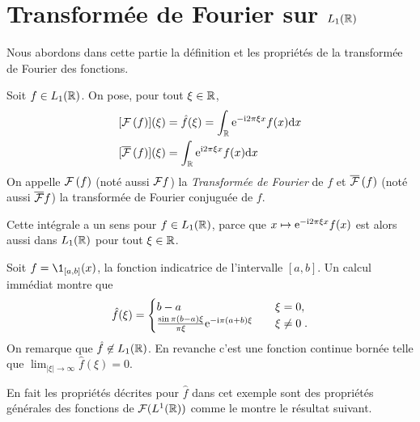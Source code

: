 
\section{Transform{\'e}e de Fourier sur $L_1(\mathbb{R})$}

Nous abordons dans cette partie la d{\'e}finition et les propri{\'e}t{\'e}s de la transform{\'e}e de Fourier des fonctions.
\begin{definition}
Soit $f \in L_1(\mathbb{R})$. On pose, pour tout $\xi\in\mathbb{R}$,
\begin{align}
\label{eq:TFL1}
&[\mathcal{F}\left( f \right)](\xi)= \hat{f}(\xi) = \int_{\mathbb{R}} \mathrm{e}^{- \mathrm{i} 2 \pi \xi x} f(x) \mathrm{d} x \\
&[\overline{\mathcal{F}}\left( f \right)](\xi) = \int_{\mathbb{R}} \mathrm{e}^{ \mathrm{i} 2 \pi \xi x} f(x) \mathrm{d} x
\end{align}
On appelle $\mathcal{F}\left( f \right)$ (not{\'e} aussi $\mathcal{F} f$) la \emph{Transform{\'e}e de Fourier} de $f$ et $\overline{\mathcal{F}}\left( f \right)$  (not{\'e} aussi $\overline{\mathcal{F}} f$) la
transform{\'e}e de Fourier conjugu{\'e}e de $f$.
\end{definition}
Cette int{\'e}grale a un sens pour $f \in L_1(\mathbb{R})$, parce que $x\mapsto \mathrm{e}^{- \mathrm{i} 2 \pi \xi x} f(x)$ est alors aussi dans
$L_1(\mathbb{R})$ pour tout $\xi\in\mathbb{R}$.
\begin{example}
Soit $f = \1_{[a,b]}(x)$, la fonction indicatrice de l'intervalle $[a,b]$. Un calcul imm{\'e}diat montre que
$$
\hat{f}(\xi) =
\begin{cases}
b-a & \quad \xi = 0, \\
\frac{\sin \pi (b-a) \xi}{\pi \xi} \mathrm{e}^{- \mathrm{i} \pi (a+b) \xi} & \quad \xi\neq0\;.
\end{cases}
$$
On remarque que $\hat{f} \not \in L_1(\mathbb{R})$. En revanche c'est une fonction continue born{\'e}e
telle que $\lim_{|\xi|\to \infty} \hat{f}(\xi)= 0$.
\end{example}
En fait les propri{\'e}t{\'e}s d{\'e}crites pour $\hat{f}$ dans cet exemple sont des propri{\'e}t{\'e}s g{\'e}n{\'e}rales des
fonctions de $\mathcal{F}(L^1(\mathbb{R}))$ comme le montre le r{\'e}sultat suivant.

